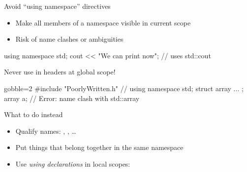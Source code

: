 \begin{advanced}
\begin{frame}[fragile]
  \begin{alertblock}{Avoid ``using namespace'' directives}
    \begin{itemize}
      \item Make all members of a namespace visible in current scope
      \item Risk of name clashes or ambiguities
    \end{itemize}
    \begin{cppcode*}{}
      using namespace std;
      cout << "We can print now\n"; // uses std::cout
    \end{cppcode*}
  \end{alertblock}
  \begin{alertblock}{Never use in headers at global scope!}
    \begin{cppcode*}{gobble=2}
      #include "PoorlyWritten.h" // using namespace std;
      struct array { ... };
      array a;  // Error: name clash with std::array
    \end{cppcode*}
  \end{alertblock}
  \begin{block}{What to do instead}
    \begin{itemize}
      \item Qualify names: , , \ldots
      \item Put things that belong together in the same namespace
      \item Use \textit{using declarations} in local scopes: 
    \end{itemize}
  \end{block}
\end{frame}

\end{advanced}
